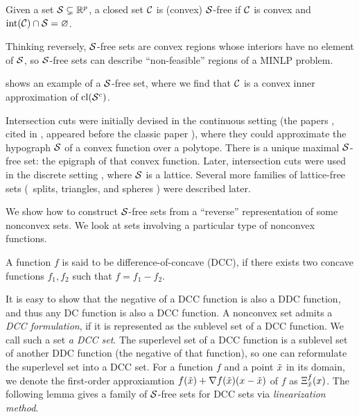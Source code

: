 \begin{definition}
    \label{def.free}
    Given  a set $\mathcal S \subsetneq \mathbb R^p$, a closed set $\mathcal C$ is (convex) $\mathcal S$-free if $\mathcal C$ is convex and $\operatorname{int}(\mathcal C) \cap \mathcal S = \varnothing$.
    \end{definition}

Thinking reversely, $\mathcal S$-free sets are convex regions whose  interiors have no element of $\mathcal S$, so $\mathcal S$-free sets can describe ``non-feasible'' regions of a MINLP problem.



 shows an example of a $\mathcal S$-free set, where we find  that  $\mathcal C$ is a convex inner approximation of  $\operatorname{cl}(\mathcal S^c)$.


Intersection cuts were initially devised in the continuous setting (the papers \cite{tuy64}, cited in \cite[Ch.~III]{horsttuy}, appeared before the classic paper \cite{balas1971intersection}), where they could approximate the hypograph $\mathcal S$ of a convex function over a polytope.   There is a  unique  maximal  $\mathcal S$-free set: the epigraph  of that convex function. Later, intersection cuts were used in the discrete setting \cite{balas1971intersection}, where $\mathcal S$ is  a lattice. Several more families of lattice-free sets ({\eg}~splits, triangles, and spheres \cite{conforti2014,liberti2008spherical}) were described later.

We show how to construct $\mathcal S$-free sets from a ``reverse'' representation of some nonconvex sets. We  look at  sets involving a particular type of nonconvex functions.

\begin{definition}
A function $f$ is said to be  difference-of-concave (DCC), if  there exists two concave functions $f_1,f_2$ such that $f=f_1 - f_2$.
\end{definition}

It is easy to show that the negative of a DCC function is also a DDC function, and thus any DC function is also a DCC function. A nonconvex set admits a \emph{DCC formulation}, if it is represented as the sublevel set of a DCC function. We call such a set \emph{a DCC set}.  The superlevel set of a DCC function is a sublevel set of another DDC function (the negative of that function), so one can reformulate the superlevel set into a DCC set.  For a  function $f$ and a point $\tilde{x}$ in its domain, we denote the first-order approxiamtion $f(\tilde{x}) + \nabla f(\tilde{x})(x - \tilde{x})$ of $f$ as ${\Xi^{f}_{\tilde{x}}}(x)$. The following  lemma gives a family of $\mathcal S$-free sets for DCC sets via \emph{linearization method}.

